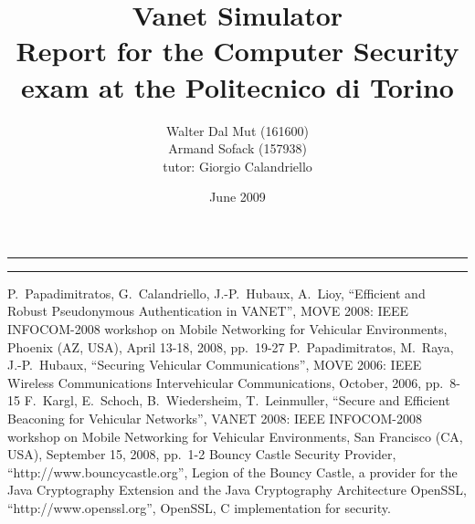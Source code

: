 \documentclass[a4paper,12pt]{article}
\begin{document}
\title{Vanet Simulator
\\
{\normalsize Report for the Computer Security exam at the Politecnico di Torino}
}
\author{Walter Dal Mut (161600)\\Armand Sofack (157938)
\\
{\normalsize tutor: Giorgio Calandriello}
}
\date{June 2009}
\maketitle

\vfill

\rule{\textwidth}{1pt}

\tableofcontents

\rule{\textwidth}{1pt}

\vfill








\begin{thebibliography}{99}\label{bibliography}
%
%
P.~Papadimitratos, G.~Calandriello, J.-P.~Hubaux, A.~Lioy,
``Efficient and Robust Pseudonymous Authentication in VANET'',
MOVE 2008: IEEE INFOCOM-2008 workshop on Mobile Networking for Vehicular Environments,
Phoenix (AZ, USA), April 13-18, 2008, pp.~19-27 
P.~Papadimitratos, M.~Raya, J.-P.~Hubaux,
``Securing Vehicular Communications'',
MOVE 2006: IEEE Wireless Communications Intervehicular Communications,
October, 2006, pp.~8-15 
F.~Kargl, E.~Schoch, B.~Wiedersheim, T.~Leinmuller,
``Secure and Efficient Beaconing for Vehicular Networks'',
VANET 2008: IEEE INFOCOM-2008 workshop on Mobile Networking for Vehicular Environments,
San Francisco (CA, USA), September 15, 2008, pp.~1-2 
Bouncy Castle Security Provider,
``http://www.bouncycastle.org'',
Legion of the Bouncy Castle, a provider for the Java Cryptography Extension and the Java Cryptography Architecture
OpenSSL,
``http://www.openssl.org'',
OpenSSL, C implementation for security.
\end{thebibliography}
\end{document}
